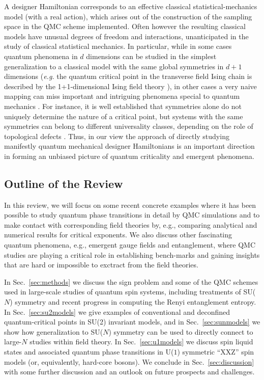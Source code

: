 \documentclass[range]{ar2e}
\begin{document}
A designer Hamiltonian
corresponds to an effective classical statistical-mechanics model (with a real action), which arises out of the construction of the sampling space in the QMC 
scheme implemented. Often however the resulting classical models have unusual degrees of freedom and interactions, unanticipated in the study of classical statistical mechanics. In particular, while in some cases quantum phenomena in $d$ dimensions can be studied in the simplest generalization to a classical model with the same global symmetries in $d+1$ dimensions \cite{Rieger94,Sorensen92,Nahum11} ({\em e.g.} the quantum critical point in the transverse field Ising chain is described by the 1+1-dimensional Ising field theory \cite{Sachdev11}), in other cases a very naive mapping can miss important and intriguing phenomena special to quantum mechanics \cite{Senthil04a,Fradkin04,Sachdev08}. For instance, it is well established that symmetries alone do not uniquely 
determine the nature of a critical point, but systems with the same symmetries can belong to different universality classes, 
depending on the role of topological defects \cite{Motrunich04}. Thus, in our view the approach of directly studying manifestly quantum mechanical 
designer Hamiltonians is an important direction in forming an unbiased picture of quantum criticality and emergent phenomena.


\subsection{Outline of the Review}

In this review, we will focus on some recent concrete examples where it has been possible to study quantum phase transitions in detail 
by QMC simulations and to make contact with corresponding field theories by, e.g., comparing analytical and numerical results for critical 
exponents. We also discuss other fascinating quantum phenomena, e.g., emergent gauge fields and entanglement, where QMC studies are
playing a critical role in establishing bench-marks and gaining insights that are hard or impossible to exctract from the field theories.

In Sec.~\ref{sec:methods} we discuss the sign problem and some of the QMC schemes used in large-scale studies of quantum spin systems, 
including treatments of SU($N$) symmetry and recent progress in computing the Renyi entanglement entropy. In Sec.~\ref{sec:su2models} 
we give examples of conventional and deconfined quantum-critical points in SU(2) invariant models, and in Sec.~\ref{sec:sunmodels} 
we show how generalization to SU($N$) symmetry can be used to directly connect to large-$N$ studies within field theory. In Sec.~\ref{sec:u1models} 
we discuss spin liquid states and associated quantum phase transitions in U($1$) symmetric ``XXZ'' spin models (or, equivalently, hard-core bosons). 
We conclude in Sec.~\ref{sec:discussion} with some further discussion and an outlook on future prospects and challenges.
\end{document}
